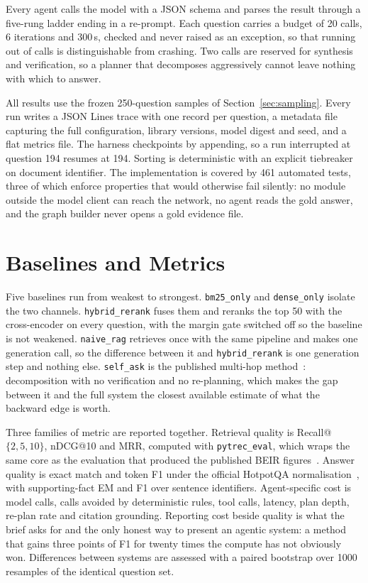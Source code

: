 Every agent calls the model with a JSON schema and parses the result through a
five-rung ladder ending in a re-prompt. Each question carries a budget of 20
calls, 6 iterations and 300\,s, checked and never raised as an exception, so
that running out of calls is distinguishable from crashing. Two calls are
reserved for synthesis and verification, so a planner that decomposes
aggressively cannot leave nothing with which to answer.

All results use the frozen 250-question samples of Section~\ref{sec:sampling}.
Every run writes a JSON Lines trace with one record per question, a metadata
file capturing the full configuration, library versions, model digest and
seed, and a flat metrics file. The harness checkpoints by appending, so a run
interrupted at question 194 resumes at 194. Sorting is deterministic with an
explicit tiebreaker on document identifier. The implementation is covered by
461 automated tests, three of which enforce properties that would otherwise
fail silently: no module outside the model client can reach the network, no
agent reads the gold answer, and the graph builder never opens a gold evidence
file.

\section{Baselines and Metrics}
\label{sec:baselines}

Five baselines run from weakest to strongest. \texttt{bm25\_only} and
\texttt{dense\_only} isolate the two channels. \texttt{hybrid\_rerank} fuses
them and reranks the top 50 with the cross-encoder on every question, with the
margin gate switched off so the baseline is not weakened. \texttt{naive\_rag}
retrieves once with the same pipeline and makes one generation call, so the
difference between it and \texttt{hybrid\_rerank} is one generation step and
nothing else. \texttt{self\_ask} is the published multi-hop
method~\cite{press2023selfask}: decomposition with no verification and no
re-planning, which makes the gap between it and the full system the closest
available estimate of what the backward edge is worth.

Three families of metric are reported together. Retrieval quality is
Recall@$\{2,5,10\}$, nDCG@10 and MRR, computed with \texttt{pytrec\_eval},
which wraps the same core as the evaluation that produced the published BEIR
figures~\cite{thakur2021beir}. Answer quality is exact match and token F1
under the official HotpotQA normalisation~\cite{yang2018hotpotqa}, with
supporting-fact EM and F1 over sentence identifiers. Agent-specific cost is
model calls, calls avoided by deterministic rules, tool calls, latency, plan
depth, re-plan rate and citation grounding. Reporting cost beside quality is
what the brief asks for and the only honest way to present an agentic system:
a method that gains three points of F1 for twenty times the compute has not
obviously won. Differences between systems are assessed with a paired
bootstrap over 1000 resamples of the identical question set.

